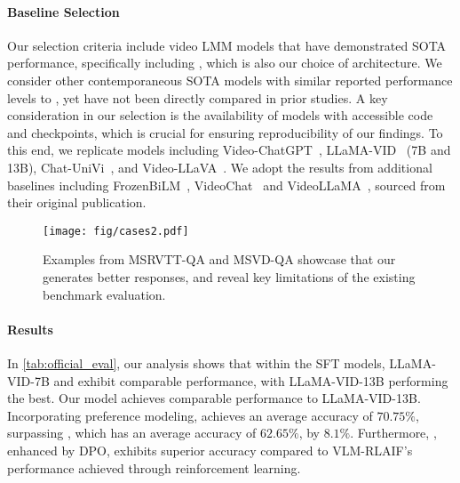 \paragraph{Baseline Selection}
Our selection criteria include video LMM models that have demonstrated SOTA performance, specifically including \videollava, which is also our choice of architecture. We consider other contemporaneous SOTA models with similar reported performance levels to \videollava, yet have not been directly compared in prior studies. A key consideration in our selection is the availability of models with accessible code and checkpoints, which is crucial for ensuring reproducibility of our findings. To this end, we replicate models including Video-ChatGPT~\citep{maaz2023video}, LLaMA-VID~\citep{li2023llama} (7B and 13B), Chat-UniVi~\citep{Chat-UniVi}, and Video-LLaVA~\cite{lin2023video}. We adopt the results from additional baselines including FrozenBiLM~\citep{yang2022zero}, VideoChat~\citep{li2023videochat} and VideoLLaMA~\citep{zhang2023video}, sourced from their original publication. 

\begin{figure}[t!]
    \centering
    \vspace{-1cm}
    \texttt{[image: fig/cases2.pdf]}
    \caption{Examples from MSRVTT-QA and MSVD-QA showcase that our \modelname generates better responses, and reveal key limitations of the existing benchmark evaluation.}
    \label{fig:error-analysis}
\end{figure}

\paragraph{Results} In \cref{tab:official_eval}, our analysis shows that within the SFT models, LLaMA-VID-7B and \videollava exhibit comparable performance, with LLaMA-VID-13B performing the best. Our \modelsft model achieves comparable performance to LLaMA-VID-13B. Incorporating preference modeling, \modelname achieves an average accuracy of $70.75\%$, surpassing \modelsft, which has an average accuracy of $62.65\%$, by $8.1\%$. Furthermore, \modelname, enhanced by DPO, exhibits superior accuracy compared to VLM-RLAIF's performance achieved through reinforcement learning.

